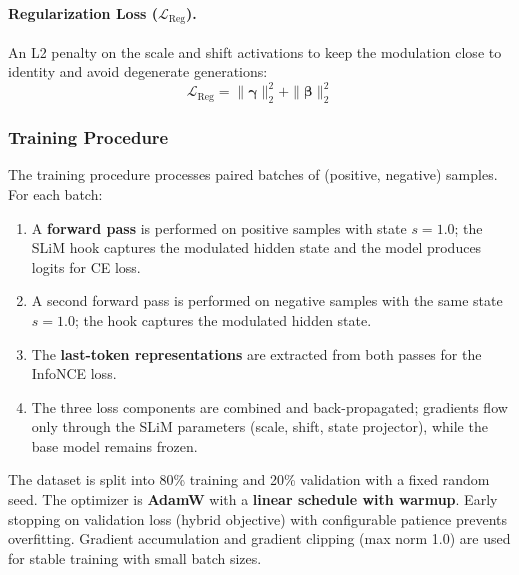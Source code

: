 \paragraph{Regularization Loss ($\mathcal{L}_{\mathrm{Reg}}$).}
An L2 penalty on the scale and shift activations to keep the modulation close to identity and avoid degenerate generations:
\begin{equation}
\label{eq:slimtruth_reg}
\mathcal{L}_{\mathrm{Reg}} = \|\boldsymbol{\gamma}\|_2^2 + \|\boldsymbol{\beta}\|_2^2
\end{equation}

\subsubsection{Training Procedure}

The training procedure processes paired batches of (positive, negative) samples. For each batch:
\begin{enumerate}
    \item A \textbf{forward pass} is performed on positive samples with state $s = 1.0$; the SLiM hook captures the modulated hidden state and the model produces logits for CE loss.
    \item A second forward pass is performed on negative samples with the same state $s = 1.0$; the hook captures the modulated hidden state.
    \item The \textbf{last-token representations} are extracted from both passes for the InfoNCE loss.
    \item The three loss components are combined and back-propagated; gradients flow only through the SLiM parameters (scale, shift, state projector), while the base model remains frozen.
\end{enumerate}

The dataset is split into 80\% training and 20\% validation with a fixed random seed. The optimizer is \textbf{AdamW} with a \textbf{linear schedule with warmup}. Early stopping on validation loss (hybrid objective) with configurable patience prevents overfitting. Gradient accumulation and gradient clipping (max norm 1.0) are used for stable training with small batch sizes.

